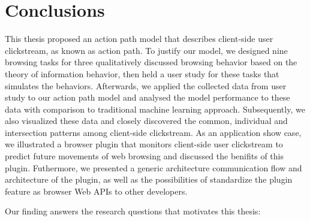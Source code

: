 \section{Conclusions}
\label{ch:final}



This thesis proposed an action path model that describes client-side user clickstream,
as known as action path.
To justify our model, we designed nine browsing tasks for three qualitatively
discussed browsing behavior based on the theory of information behavior, then 
held a user study for these tasks that simulates the behaviors. 
Afterwards, we applied the collected data from user study to our action path model and
analysed the model performance to these data with comparison to traditional machine 
learning approach.
Subsequently, we also visualized these data and closely discovered the common, 
individual and intersection patterns among client-side clickstream.
As an application show case, we illustrated a browser plugin that monitors client-side 
user clickstream to predict future movements of web browsing and discussed the benifits of this plugin.
Futhermore, we presented a generic architecture communication flow and architecture of the plugin, 
as well as the possibilities of standardize the plugin feature as browser Web APIs to other developers.


Our finding answers the research questions that motivates this thesis:

